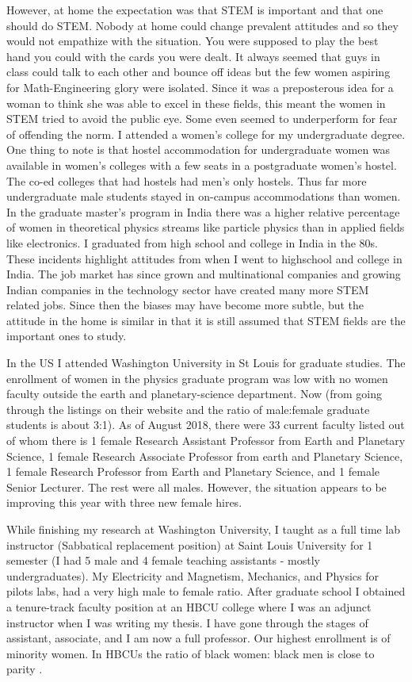 \documentclass[utf8]{frontiersSCNS} %
\begin{document}
However, at home the expectation was that STEM is important and that one should do STEM. Nobody at home could change prevalent attitudes and so they would not empathize with the situation. You were supposed to play the best hand you could with the cards you were dealt. It always seemed that guys in class could talk to each other and bounce off ideas but the few women aspiring for Math-Engineering glory were isolated.  Since it was a preposterous idea for a woman to think she was able to excel in these fields, this meant the women in STEM tried to avoid the public eye. Some even seemed to underperform for fear of offending the norm. I attended a women's college for my undergraduate degree. One thing to note is that hostel accommodation for undergraduate women was available in women's colleges with a few seats in a postgraduate women's hostel. The co-ed colleges that had hostels had men's only hostels. Thus far more undergraduate male students stayed in on-campus accommodations than women. In the graduate master's program in India there was a higher relative percentage of women in theoretical physics streams like particle physics than in applied fields like electronics. I graduated from high school and college in India in the 80s. These incidents highlight attitudes from when I went to highschool and college in India. The job market has since grown and multinational companies and growing Indian companies in the technology sector have created many more STEM related jobs. Since then the biases may have become more subtle, but the attitude in the home is similar in that it is still assumed that STEM fields are the important ones to study. 

In the US I attended Washington University in St Louis for graduate studies. The enrollment of women in the physics graduate program was low with no women faculty outside the earth and planetary-science department. Now (from going through the listings on their website and the ratio of male:female graduate students is about 3:1). As of August 2018, there were 33 current faculty listed out of whom there is 1 female Research Assistant Professor from Earth and Planetary Science, 1 female Research Associate Professor from earth and Planetary Science, 1 female Research Professor from Earth and Planetary Science, and 1 female Senior Lecturer. The rest were all males. However, the situation appears to be improving this year with three new female hires.

While finishing my research at Washington University, I taught as a full time lab instructor (Sabbatical replacement position) at Saint Louis University for 1 semester (I had 5 male and 4 female teaching assistants - mostly undergraduates). My Electricity and Magnetism, Mechanics, and Physics for pilots labs, had a very high male to female ratio. After graduate school I obtained a tenure-track faculty position at an HBCU college where I was an adjunct instructor when I was writing my thesis. I have gone through the stages of assistant, associate, and I am now a full professor. Our highest enrollment is of minority women.  In HBCUs the ratio of black women: black men is close to parity \citep{simms2014educational}.  
\end{document}
